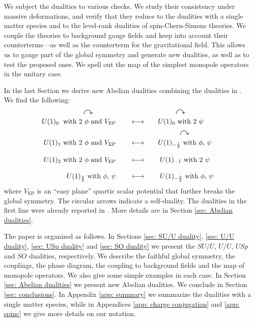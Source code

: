 \documentclass[a4paper, 12pt]{article}
\numberwithin{equation}{section}
\newcommand{\bea}{\begin{equation} \begin{aligned}} \newcommand{\eea}{\end{aligned} \end{equation}}
\begin{document}
We subject the dualities to various checks. We study their consistency under massive deformations, and verify that they reduce to the dualities with a single matter species \cite{Aharony:2015mjs, Hsin:2016blu, Aharony:2016jvv} and to the level-rank dualities of spin-Chern-Simons theories. We couple the theories to background gauge fields and keep into account their counterterms---as well as the counterterm for the gravitational field. This allows us to gauge part of the global symmetry and generate new dualities, as well as to test the proposed ones. We spell out the map of the simplest monopole operators in the unitary case.

In the last Section we derive new Abelian dualities combining the dualities in \cite{Seiberg:2016gmd}. We find the following:
\bea
U(1)_0 \stackrel{\rule{0pt}{.7em}^\text{\Large$\curvearrowright$}}{\text{ with 2 $\phi$ and $V_\text{EP}$}} &\qquad\longleftrightarrow\qquad \stackrel{\rule{0pt}{.7em}^\text{\Large$\curvearrowright$}}{U(1)_0 \text{ with 2 $\psi$}} \\
U(1)_1 \text{ with 2 $\phi$ and $V_\text{EP}$} &\qquad\longleftrightarrow\qquad \stackrel{\rule{0pt}{.7em}^\text{\Large$\curvearrowright$}}{U(1)_{-\frac12} \text{ with $\phi$, $\psi$}} \\[.3em]
U(1)_2 \text{ with 2 $\phi$ and $V_\text{EP}$} &\qquad\longleftrightarrow\qquad U(1)_{-1} \text{ with 2 $\psi$} \\[.6em]
U(1)_\frac32 \text{ with $\phi$, $\psi$} &\qquad\longleftrightarrow\qquad U(1)_{-\frac32} \text{ with $\phi$, $\psi$}
\eea
where $V_\text{EP}$ is an ``easy plane'' quartic scalar potential that further breaks the global symmetry. The circular arrows indicate a self-duality.
The dualities in the first line were already reported in \cite{Motrunich:2003fz, Xu:2015lxa, Karch:2016sxi, Hsin:2016blu, Benini:2017dus, Wang:2017txt}. More details are in Section \ref{sec: Abelian dualities}.

The paper is organized as follows. In Sections \ref{sec: SU/U duality}, \ref{sec: U/U duality}, \ref{sec: USp duality} and \ref{sec: SO duality} we present the $SU/U$, $U/U$, $USp$ and $SO$ dualities, respectively. We describe the faithful global symmetry, the couplings, the phase diagram, the coupling to background fields and the map of monopole operators. We also give some simple examples in each case. In Section \ref{sec: Abelian dualities} we present new Abelian dualities. We conclude in Section \ref{sec: conclusions}. In Appendix \ref{app: summary} we summarize the dualities with a single matter species, while in Appendices \ref{app: charge conjugation} and \ref{app: spinc} we give more details on our notation.
\end{document}
